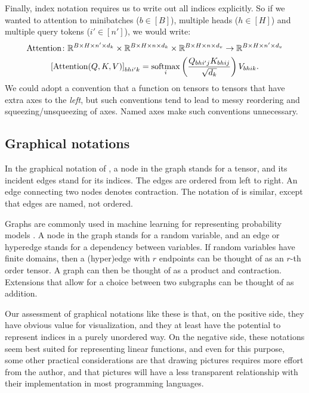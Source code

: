 Finally, index notation requires us to write out all indices explicitly. So if we wanted to \liftVB{} attention to minibatches ($b \in [B]$), multiple heads ($h \in [H]$) and multiple query tokens ($i' \in [n']$), we would write:
\begin{gather*}
  \text{Attention} \colon \mathbb{R}^{B \times H \times n' \times d_k} \times \mathbb{R}^{B \times H \times n \times d_k} \times \mathbb{R}^{B \times H \times n \times d_v} \rightarrow \mathbb{R}^{B \times H \times n' \times d_v} \\
  \left[\text{Attention}(Q, K, V)\right]_{bhi'k} = \operatorname*{softmax}_i \left( \frac{Q_{bhi'j} K_{bhij}}{\sqrt{d_k}} \right) V_{bhik}.
\end{gather*}
We could adopt a convention that \liftsVBZ{} a function on tensors to tensors that have extra axes to the \emph{left}, but such conventions tend to lead to messy reordering and squeezing/unsqueezing of axes. Named axes make such conventions unnecessary.

\subsection{Graphical notations}

In the graphical notation of \citet{penrose:1971}, a node in the graph stands for a tensor, and its incident edges stand for its indices. The edges are ordered from left to right. An edge connecting two nodes denotes contraction. The notation of \citet{alsberg:1997} is similar, except that edges are named, not ordered.

Graphs are commonly used in machine learning for representing probability models \citep{koller+friedman:2009}. A node in the graph stands for a random variable, and an edge or hyperedge stands for a dependency between variables. If random variables have finite domains, then a (hyper)edge with $r$ endpoints can be thought of as an $r$-th order tensor. A graph can then be thought of as a product and contraction. Extensions that allow for a choice between two subgraphs \citep[e.g.,][]{minka+winn:2008} can be thought of as addition.

Our assessment of graphical notations like these is that, on the positive side, they have obvious value for visualization, and they at least have the potential to represent indices in a purely unordered way. On the negative side, these notations seem best suited for representing linear functions, and even for this purpose, some other practical considerations are that drawing pictures requires more effort from the author, and that pictures will have a less transparent relationship with their implementation in most programming languages.

